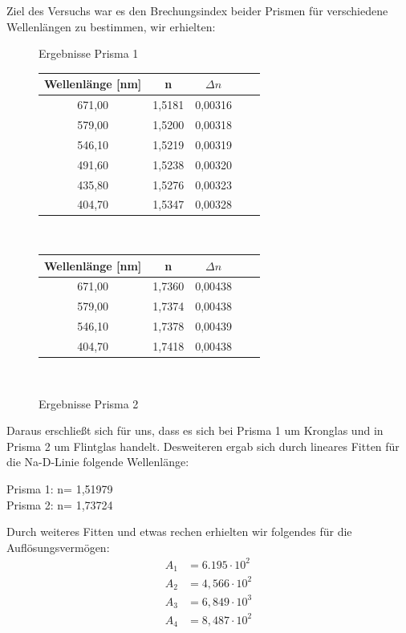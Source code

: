\documentclass[fontsize=12pt]{scrartcl}
\begin{document}
Ziel des Versuchs war es den Brechungsindex beider Prismen für verschiedene Wellenlängen zu bestimmen, wir erhielten: 
\begin{figure}[h]
\begin{minipage}{0.5\textwidth}
\centering
\caption{Ergebnisse Prisma 1}
\begin{tabular}{|c|c|c|c|c|} \hline
Wellenlänge [nm]  & n & $\Delta n$ \\ \hline
671,00 &1,5181 &0,00316
\\ \hline
579,00	&1,5200 &0,00318
\\ \hline
546,10	&1,5219 &0,00319
\\ \hline
491,60	&1,5238 &0,00320
\\ \hline
435,80	&1,5276 &0,00323
\\ \hline
404,70	&1,5347 &0,00328
\\ \hline
\end{tabular} \\
\end{minipage}
\begin{minipage}{0.5\textwidth}
\vspace{-30pt}
\centering
\caption{Ergebnisse Prisma 2}
\begin{tabular}{|c|c|c|c|c|} \hline
Wellenlänge [nm] &  n & $\Delta n$  \\ \hline
671,00	&1,7360 &0,00438
\\ \hline
579,00	&1,7374 &0,00438
\\ \hline
546,10	&1,7378 &0,00439
\\ \hline
404,70	&1,7418 &0,00438
\\ \hline
\end{tabular} \\
\end{minipage}
\end{figure}

\noindent
Daraus erschließt sich für uns, dass es sich bei Prisma 1 um Kronglas und in Prisma 2 um Flintglas handelt. Desweiteren ergab sich durch lineares Fitten für die Na-D-Linie folgende Wellenlänge:
\begin{center}
Prisma 1: 	n= 1,51979 \\
Prisma 2:	n= 1,73724
\end{center}
\noindent
Durch weiteres Fitten und etwas rechen erhielten wir folgendes für die Auflösungsvermögen:
\begin{align*}
A _1&= 6.195\cdot 10^{2}\\
A_2&= 4,566\cdot 10^{2}\\
A_3&= 6,849\cdot 10^{3}\\
A_4&= 8,487\cdot 10^{2}
\end{align*}
\noindent
\end{document}
